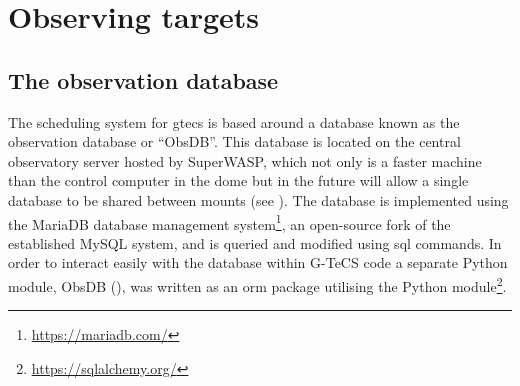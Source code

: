 
\newpage
\section{Observing targets}
\label{sec:observing}
\begin{colsection}


\begin{colsection}


\end{colsection}

\subsection{The observation database}
\label{sec:obsdb}
\begin{colsection}

The scheduling system for \gls{gtecs} is based around a database known as the observation database or ``ObsDB''. This database is located on the central observatory server hosted by SuperWASP, which not only is a faster machine than the control computer in the dome but in the future will allow a single database to be shared between mounts (see ). The database is implemented using the MariaDB database management system\footnote{\url{https://mariadb.com/}}, an open-source fork of the established MySQL system, and is queried and modified using \gls{sql} commands. In order to interact easily with the database within G-TeCS code a separate Python module, ObsDB (), was written as an \gls{orm} package utilising the Python  module\footnote{\url{https://sqlalchemy.org/}}.


\end{colsection}
\end{colsection}
